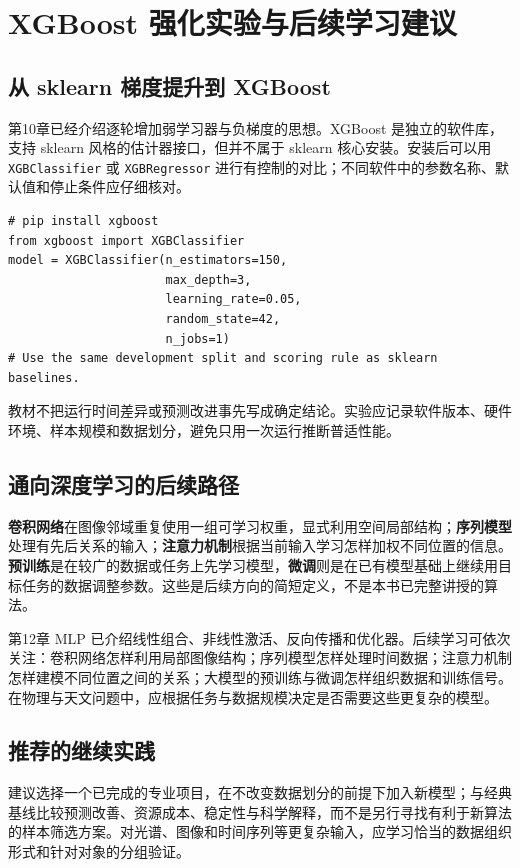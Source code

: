 \chapter{XGBoost 强化实验与后续学习建议}
\section{从 sklearn 梯度提升到 XGBoost}
第10章已经介绍逐轮增加弱学习器与负梯度的思想。XGBoost 是独立的软件库，支持 sklearn 风格的估计器接口，但并不属于 sklearn 核心安装。安装后可以用 \texttt{XGBClassifier} 或 \texttt{XGBRegressor} 进行有控制的对比；不同软件中的参数名称、默认值和停止条件应仔细核对。
\begin{lstlisting}[caption={可选 XGBoost 分类模型骨架，需要另行安装 xgboost}]
# pip install xgboost
from xgboost import XGBClassifier
model = XGBClassifier(n_estimators=150,
                      max_depth=3,
                      learning_rate=0.05,
                      random_state=42,
                      n_jobs=1)
# Use the same development split and scoring rule as sklearn baselines.
\end{lstlisting}
教材不把运行时间差异或预测改进事先写成确定结论。实验应记录软件版本、硬件环境、样本规模和数据划分，避免只用一次运行推断普适性能。
\section{通向深度学习的后续路径}
\textbf{卷积网络}在图像邻域重复使用一组可学习权重，显式利用空间局部结构；\textbf{序列模型}处理有先后关系的输入；\textbf{注意力机制}根据当前输入学习怎样加权不同位置的信息。\textbf{预训练}是在较广的数据或任务上先学习模型，\textbf{微调}则是在已有模型基础上继续用目标任务的数据调整参数。这些是后续方向的简短定义，不是本书已完整讲授的算法。

第12章 MLP 已介绍线性组合、非线性激活、反向传播和优化器。后续学习可依次关注：卷积网络怎样利用局部图像结构；序列模型怎样处理时间数据；注意力机制怎样建模不同位置之间的关系；大模型的预训练与微调怎样组织数据和训练信号。在物理与天文问题中，应根据任务与数据规模决定是否需要这些更复杂的模型。
\section{推荐的继续实践}
建议选择一个已完成的专业项目，在不改变数据划分的前提下加入新模型；与经典基线比较预测改善、资源成本、稳定性与科学解释，而不是另行寻找有利于新算法的样本筛选方案。对光谱、图像和时间序列等更复杂输入，应学习恰当的数据组织形式和针对对象的分组验证。


